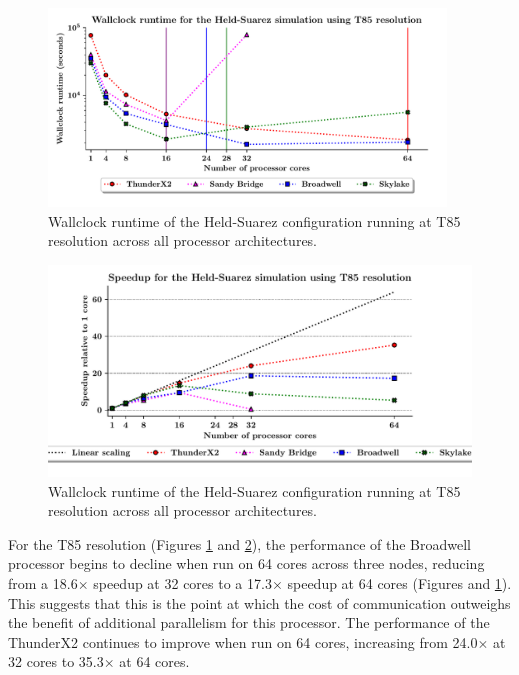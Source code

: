 \documentclass[a4paper,11pt]{report}
\begin{document}
\begin{figure}[htbp]
\begin{center}
\includegraphics[width=0.94\textwidth]{img/scaling_graph_T85_Held_suarez.pdf}
\caption{Wallclock runtime of the Held-Suarez configuration running at T85 resolution across all processor architectures.}
\label{fig:t85-scale}
\end{center}
\end{figure}


\par



\par
\begin{figure}[htbp]
\begin{center}
\includegraphics[width=1\textwidth]{img/speedup-T85-Held_suarez.pdf}
\caption{Wallclock runtime of the Held-Suarez configuration running at T85 resolution across all processor architectures. }
\label{fig:t85-speedup}
\end{center}
\end{figure}
\par	
For the T85 resolution (Figures \ref{fig:t85-scale} and \ref{fig:t85-speedup}), the performance of the Broadwell processor begins to decline when run on 64 cores across three nodes, reducing from a 18.6$\times$ speedup at 32 cores to a 17.3$\times$ speedup at 64 cores (Figures  and \ref{fig:t85-scale}). This suggests that this is the point at which the cost of communication outweighs the benefit of additional parallelism for this processor. The performance of the ThunderX2 continues to improve when run on 64 cores, increasing from 24.0$\times$ at 32 cores to 35.3$\times$ at 64 cores.
\end{document}
